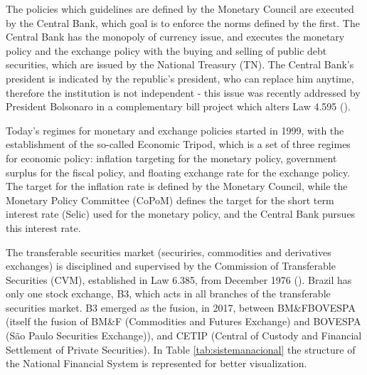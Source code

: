 \documentclass[cic,tc, english]{iiufrgs}
\begin{document}
    The policies which guidelines are defined by the Monetary Council are executed by the Central Bank, which goal is to enforce the norms defined by the first. The Central Bank has the monopoly of currency issue, and executes the monetary policy and the exchange policy with the buying and selling of public debt securities, which are issued by the National Treasury (TN). The Central Bank's president is indicated by the republic's president, who can replace him anytime, therefore the institution is not independent - this issue was recently addressed by President Bolsonaro in a complementary bill project which alters Law 4.595 (\citet{lei4595}).

    Today's regimes for monetary and exchange policies started in 1999, with the establishment of the so-called Economic Tripod, which is a set of three regimes for economic policy: inflation targeting for the monetary policy, government surplus for the fiscal policy, and floating exchange rate for the exchange policy. The target for the inflation rate is defined by the Monetary Council, while the Monetary Policy Committee (CoPoM) defines the target for the short term interest rate (Selic) used for the monetary policy, and the Central Bank pursues this interest rate.

    The transferable securities market (securiries, commodities and derivatives exchanges) is disciplined and supervised by the Commission of Transferable Securities (CVM), established in Law 6.385, from December 1976 (\citet{lei6385}). Brazil has only one stock exchange, B3, which acts in all branches of the transferable securities market. B3 emerged as the fusion, in 2017, between BM\&FBOVESPA (itself the fusion of BM\&F (Commodities and Futures Exchange) and BOVESPA (São Paulo Securities Exchange)), and CETIP (Central of Custody and Financial Settlement of Private Securities).  In Table \ref{tab:sistemanacional} the structure of the National Financial System is represented for better visualization.
\end{document}
